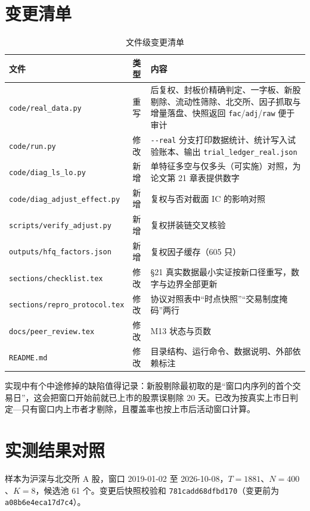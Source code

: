 \documentclass[11pt,a4paper]{ctexart}
\begin{document}
\section{变更清单}

\begin{table}[htbp]
\centering
\caption{文件级变更清单}
\label{tab:files}
\begin{tabular}{@{}>{\raggedright\arraybackslash}p{4.6cm}>{\raggedright\arraybackslash}p{1.5cm}>{\raggedright\arraybackslash}p{8.3cm}@{}}
\toprule
文件 & 类型 & 内容 \\
\midrule
\texttt{code/real\_data.py} & 重写 & 后复权、封板价精确判定、一字板、新股剔除、流动性筛除、北交所、因子抓取与增量落盘、快照返回 \texttt{fac}/\texttt{adj}/\texttt{raw} 便于审计 \\
\texttt{code/run.py} & 修改 & \texttt{{-}{-}real} 分支打印数据统计、统计写入试验账本、输出 \texttt{trial\_ledger\_real.json} \\
\texttt{code/diag\_ls\_lo.py} & 新增 & 单特征多空与仅多头（可实施）对照，为论文第 21 章表提供数字 \\
\texttt{code/diag\_adjust\_effect.py} & 新增 & 复权与否对截面 IC 的影响对照 \\
\texttt{scripts/verify\_adjust.py} & 新增 & 复权拼装链交叉核验 \\
\texttt{outputs/hfq\_factors.json} & 新增 & 复权因子缓存（605 只） \\
\texttt{sections/checklist.tex} & 修改 & §21 真实数据最小实证按新口径重写，数字与边界全部更新 \\
\texttt{sections/repro\_protocol.tex} & 修改 & 协议对照表中“时点快照”“交易制度掩码”两行 \\
\texttt{docs/peer\_review.tex} & 修改 & M13 状态与页数 \\
\texttt{README.md} & 修改 & 目录结构、运行命令、数据说明、外部依赖标注 \\
\bottomrule
\end{tabular}
\end{table}

实现中有个中途修掉的缺陷值得记录：新股剔除最初取的是“窗口内序列的首个交易日”，这会把窗口开始前就已上市的股票误剔除 20 天。已改为按真实上市日判定—只有窗口内上市者才剔除，且覆盖率也按上市后活动窗口计算。

\section{实测结果对照}

样本为沪深与北交所 A 股，窗口 2019-01-02 至 2026-10-08，$T=1881$、$N=400$、$K=8$，候选池 61 个。变更后快照校验和 \texttt{781cadd68dfbd170}（变更前为 \texttt{a08b6e4eca17d7c4}）。
\end{document}
